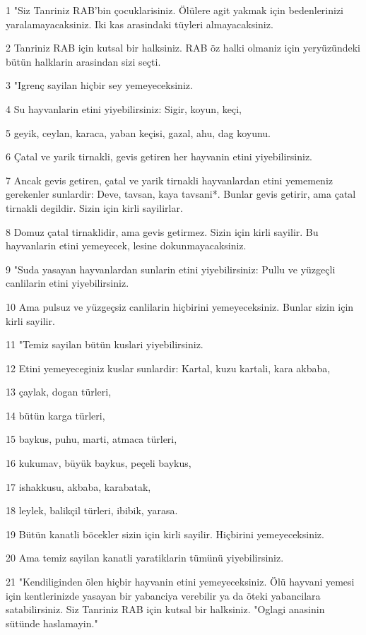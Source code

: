 \par 1 "Siz Tanriniz RAB'bin çocuklarisiniz. Ölülere agit yakmak için bedenlerinizi yaralamayacaksiniz. Iki kas arasindaki tüyleri almayacaksiniz.
\par 2 Tanriniz RAB için kutsal bir halksiniz. RAB öz halki olmaniz için yeryüzündeki bütün halklarin arasindan sizi seçti.
\par 3 "Igrenç sayilan hiçbir sey yemeyeceksiniz.
\par 4 Su hayvanlarin etini yiyebilirsiniz: Sigir, koyun, keçi,
\par 5 geyik, ceylan, karaca, yaban keçisi, gazal, ahu, dag koyunu.
\par 6 Çatal ve yarik tirnakli, gevis getiren her hayvanin etini yiyebilirsiniz.
\par 7 Ancak gevis getiren, çatal ve yarik tirnakli hayvanlardan etini yememeniz gerekenler sunlardir: Deve, tavsan, kaya tavsani*. Bunlar gevis getirir, ama çatal tirnakli degildir. Sizin için kirli sayilirlar.
\par 8 Domuz çatal tirnaklidir, ama gevis getirmez. Sizin için kirli sayilir. Bu hayvanlarin etini yemeyecek, lesine dokunmayacaksiniz.
\par 9 "Suda yasayan hayvanlardan sunlarin etini yiyebilirsiniz: Pullu ve yüzgeçli canlilarin etini yiyebilirsiniz.
\par 10 Ama pulsuz ve yüzgeçsiz canlilarin hiçbirini yemeyeceksiniz. Bunlar sizin için kirli sayilir.
\par 11 "Temiz sayilan bütün kuslari yiyebilirsiniz.
\par 12 Etini yemeyeceginiz kuslar sunlardir: Kartal, kuzu kartali, kara akbaba,
\par 13 çaylak, dogan türleri,
\par 14 bütün karga türleri,
\par 15 baykus, puhu, marti, atmaca türleri,
\par 16 kukumav, büyük baykus, peçeli baykus,
\par 17 ishakkusu, akbaba, karabatak,
\par 18 leylek, balikçil türleri, ibibik, yarasa.
\par 19 Bütün kanatli böcekler sizin için kirli sayilir. Hiçbirini yemeyeceksiniz.
\par 20 Ama temiz sayilan kanatli yaratiklarin tümünü yiyebilirsiniz.
\par 21 "Kendiliginden ölen hiçbir hayvanin etini yemeyeceksiniz. Ölü hayvani yemesi için kentlerinizde yasayan bir yabanciya verebilir ya da öteki yabancilara satabilirsiniz. Siz Tanriniz RAB için kutsal bir halksiniz. "Oglagi anasinin sütünde haslamayin."
